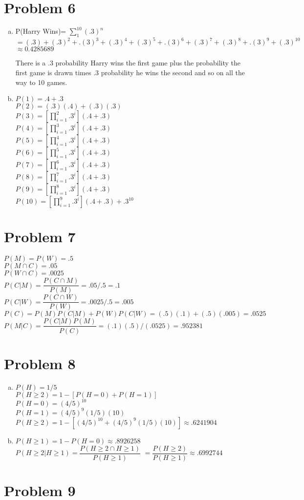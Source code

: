 \documentclass{article}
\begin{document}
\begin{flushleft}
\section*{Problem 6}
\begin{enumerate}[(a)]
\item
P(Harry Wins)= $\sum_{1}^{10}(.3)^n$\medbreak $=(.3)+(.3)^2+.(3)^3+(.3)^4+(.3)^5+.(3)^6+(.3)^7+(.3)^8+.(3)^9+(.3)^{10}$\\
$\approx 0.4285689$ \medbreak

There is a .3 probability Harry wins the first game plus the probability the first game is drawn times .3 probability he wins the second and so on all the way to 10 games.
\item
$P(1)=.4+.3$\\
$P(2)=(.3)(.4)+(.3)(.3)$\\
$P(3)=[\prod_{i=1}^{2}.3^i](.4+.3)$\\
$P(4)=[\prod_{i=1}^{3}.3^i](.4+.3)$\\
$P(5)=[\prod_{i=1}^{4}.3^i](.4+.3)$\\
$P(6)=[\prod_{i=1}^{5}.3^i](.4+.3)$\\
$P(7)=[\prod_{i=1}^{6}.3^i](.4+.3)$\\
$P(8)=[\prod_{i=1}^{7}.3^i](.4+.3)$\\
$P(9)=[\prod_{i=1}^{8}.3^i](.4+.3)$\\
$P(10)=[\prod_{i=1}^{9}.3^i](.4+.3)+.3^{10}$\\
\end{enumerate}
\section*{Problem 7}
$P(M)=P(W)=.5$\\
$P(M\cap C)=.05$\\
$P(W \cap C)=.0025$\\
$P(C|M)=\dfrac{P(C\cap M)}{P(M)}=.05/.5=.1$\\
$P(C|W)=\dfrac{P(C\cap W)}{P(W)}=.0025/.5=.005$\\
$P(C)=P(M)P(C|M)+P(W)P(C|W)=(.5)(.1)+(.5)(.005)=.0525$\medbreak
$P(M|C)=\dfrac{P(C|M)P(M)}{P(C)}=(.1)(.5)/(.0525)=.952381$
\section*{Problem 8}
\begin{enumerate}[(a)]
\item	
$P(H)=1/5$\\
$P(H\geq 2)=1-[P(H=0)+P(H=1)]$\\
$P(H=0)=(4/5)^{10}$\\
$P(H=1)=(4/5)^9(1/5)(10)$\\
$P(H\geq 2)=1-[(4/5)^{10}+(4/5)^9(1/5)(10)]\approx .6241904$
\item
$P(H \geq 1)=1-P(H=0)\approx .8926258$\medbreak
$P(H\geq 2|H \geq 1)=\dfrac{P(H\geq 2 \cap H \geq 1)}{P(H\geq 1)}$\medbreak
$=\dfrac{P(H\geq 2)}{P(H \geq 1)}\approx.6992744$
\end{enumerate}
\section*{Problem 9}



\end{flushleft}
\end{document}
